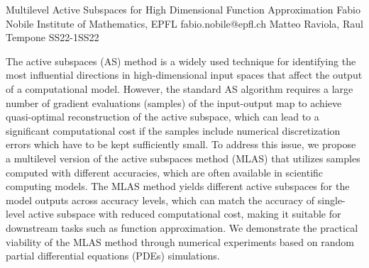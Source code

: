 \begin{talk}
  {Multilevel Active Subspaces for High Dimensional Function Approximation}%
  {Fabio Nobile}%
  {Institute of Mathematics, EPFL}%
  {fabio.nobile@epfl.ch}%
  {Matteo Raviola, Raul Tempone}%
{}{}{SS22-1}{SS22}


				
The active subspaces (AS) method is a widely used technique for identifying the most influential directions in high-dimensional input spaces that affect the output of a computational model. However, the standard AS algorithm requires a large number of gradient evaluations (samples) of the input-output map to achieve quasi-optimal reconstruction of the active subspace, which can lead to a significant computational cost if the samples include numerical discretization errors which have to be kept sufficiently small. To address this issue, we propose a multilevel version of the active subspaces method (MLAS) that utilizes samples computed with different accuracies, which are often available in scientific computing models. The MLAS method yields different active subspaces for the model outputs across accuracy levels, which can match the accuracy of single-level active subspace with reduced computational cost, making it suitable for downstream tasks such as function approximation. We demonstrate the practical viability of the MLAS method through numerical experiments based on random partial differential equations (PDEs) simulations. 				


\end{talk}

